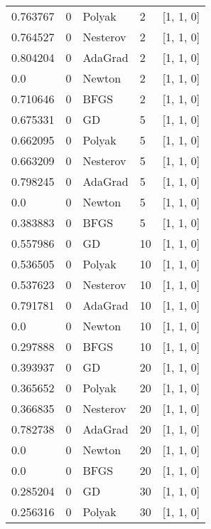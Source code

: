 \begin{tabular}{lllll}
  0.763767 &        0 &   Polyak &      2 &        [1, 1, 0] \\
  0.764527 &        0 & Nesterov &      2 &        [1, 1, 0] \\
  0.804204 &        0 &  AdaGrad &      2 &        [1, 1, 0] \\
       0.0 &        0 &   Newton &      2 &        [1, 1, 0] \\
  0.710646 &        0 &     BFGS &      2 &        [1, 1, 0] \\
  0.675331 &        0 &       GD &      5 &        [1, 1, 0] \\
  0.662095 &        0 &   Polyak &      5 &        [1, 1, 0] \\
  0.663209 &        0 & Nesterov &      5 &        [1, 1, 0] \\
  0.798245 &        0 &  AdaGrad &      5 &        [1, 1, 0] \\
       0.0 &        0 &   Newton &      5 &        [1, 1, 0] \\
  0.383883 &        0 &     BFGS &      5 &        [1, 1, 0] \\
  0.557986 &        0 &       GD &     10 &        [1, 1, 0] \\
  0.536505 &        0 &   Polyak &     10 &        [1, 1, 0] \\
  0.537623 &        0 & Nesterov &     10 &        [1, 1, 0] \\
  0.791781 &        0 &  AdaGrad &     10 &        [1, 1, 0] \\
       0.0 &        0 &   Newton &     10 &        [1, 1, 0] \\
  0.297888 &        0 &     BFGS &     10 &        [1, 1, 0] \\
  0.393937 &        0 &       GD &     20 &        [1, 1, 0] \\
  0.365652 &        0 &   Polyak &     20 &        [1, 1, 0] \\
  0.366835 &        0 & Nesterov &     20 &        [1, 1, 0] \\
  0.782738 &        0 &  AdaGrad &     20 &        [1, 1, 0] \\
       0.0 &        0 &   Newton &     20 &        [1, 1, 0] \\
       0.0 &        0 &     BFGS &     20 &        [1, 1, 0] \\
  0.285204 &        0 &       GD &     30 &        [1, 1, 0] \\
  0.256316 &        0 &   Polyak &     30 &        [1, 1, 0] \\

\end{tabular}

